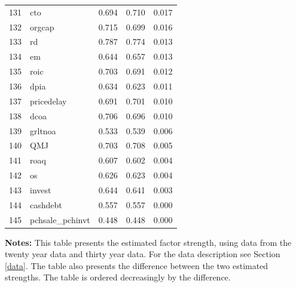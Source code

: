 \begin{footnotesize}
\begin{longtable}{rl|c|c|c}
		131 & cto & 0.694 & 0.710 & 0.017 \\ 
		132 & orgcap & 0.715 & 0.699 & 0.016 \\ 
		133 & rd & 0.787 & 0.774 & 0.013 \\ 
		134 & em & 0.644 & 0.657 & 0.013 \\ 
		135 & roic & 0.703 & 0.691 & 0.012 \\ 
		136 & dpia & 0.634 & 0.623 & 0.011 \\ 
		137 & pricedelay & 0.691 & 0.701 & 0.010 \\ 
		138 & dcoa & 0.706 & 0.696 & 0.010 \\ 
		139 & grltnoa & 0.533 & 0.539 & 0.006 \\ 
		140 & QMJ & 0.703 & 0.708 & 0.005 \\ 
		141 & roaq & 0.607 & 0.602 & 0.004 \\ 
		142 & os & 0.626 & 0.623 & 0.004 \\ 
		143 & invest & 0.644 & 0.641 & 0.003 \\ 
		144 & cashdebt & 0.557 & 0.557 & 0.000 \\ 
		145 & pchsale\_pchinvt & 0.448 & 0.448 & 0.000 \\ 
		\hline
		
	\end{longtable}

			\begin{minipage}{0.7\textwidth}
				
{\footnotesize {\bf Notes:} This table presents the estimated factor strength, using data from the twenty year data and thirty year data. For the data description see Section \ref{data}. 
	The table also presents the difference between the two estimated strengths. 
	The table is ordered decreasingly by the difference. }
\end{minipage}

\end{footnotesize}


